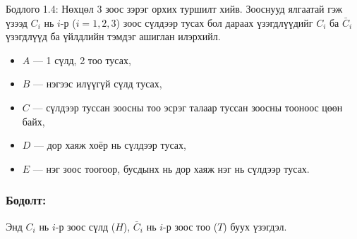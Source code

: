 \documentclass[11pt,a4paper]{article}
\begin{document}
\begin{problembox}{Бодлого 1.4: Нөхцөл}
3 зоос зэрэг орхих туршилт хийв. Зооснууд ялгаатай гэж үзээд $C_i$ нь $i$-р ($i = 1, 2, 3$) зоос сүлдээр тусах бол дараах үзэгдлүүдийг $C_i$ ба $\bar{C}_i$ үзэгдлүүд ба үйлдлийн тэмдэг ашиглан илэрхийл.
\begin{itemize}[leftmargin=1.8em, itemsep=1pt]
  \item $A$ — 1 сүлд, 2 тоо тусах,
  \item $B$ — нэгээс илүүгүй сүлд тусах,
  \item $C$ — сүлдээр туссан зоосны тоо эсрэг талаар туссан зоосны тооноос цөөн байх,
  \item $D$ — дор хаяж хоёр нь сүлдээр тусах,
  \item $E$ — нэг зоос тоогоор, бусдынх нь дор хаяж нэг нь сүлдээр тусах.
\end{itemize}
\end{problembox}

\subsubsection*{Бодолт:}

Энд $C_i$ нь $i$-р зоос сүлд ($H$), $\bar{C}_i$ нь $i$-р зоос тоо ($T$) буух үзэгдэл.
\end{document}

